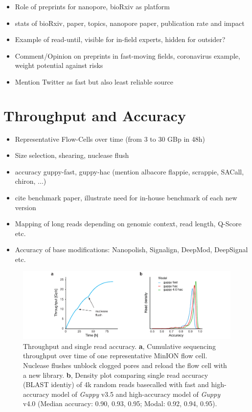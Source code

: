 \begin{itemize}
    \item Role of preprints for nanopore, bioRxiv as platform
    \item stats of bioRxiv, paper, topics, nanopore paper, publication rate and impact
    \item Example of read-until, visible for in-field experts, hidden for outsider?
    \item Comment/Opinion on preprints in fast-moving fields, coronavirus example, weight potential against risks
    \item Mention Twitter as fast but also least reliable source
\end{itemize}




\section{Throughput and Accuracy}
\label{sec:stat_of_art:throughput}

\begin{itemize}
    \item Representative Flow-Cells over time (from 3 to 30 GBp in 48h)
    \item Size selection, shearing, nuclease flush
    \item accuracy guppy-fast, guppy-hac (mention albacore flappie, scrappie, SACall, chiron, ...)
    \item cite benchmark paper, illustrate need for in-house benchmark of each new version
    \item Mapping of long reads depending on genomic context, read length, Q-Score etc.
    \item Accuracy of base modifications: Nanopolish, Signalign, DeepMod, DeepSignal etc.
\end{itemize}

\begin{figure}[h]
    \centering
    \includegraphics[width=1.0\textwidth]{figures/state_of_art/throughput.pdf}
    \captionsetup{format=plain}
    \caption[Throughput and accuracy]{Throughput and single read accuracy. \textbf{a}, Cumulative sequencing throughput over time of one representative MinION flow cell. Nuclease flushes unblock clogged pores and reload the flow cell with a new library. \textbf{b}, Density plot comparing single read accuracy (BLAST identiy) of 4k random reads basecalled with fast and high-accuracy model of \textit{Guppy} v3.5 and high-accuracy model of \textit{Guppy} v4.0 (Median accuracy: 0.90, 0.93, 0.95; Modal: 0.92, 0.94, 0.95).}
    \label{fig:state_of_art:throughput}
\end{figure}

